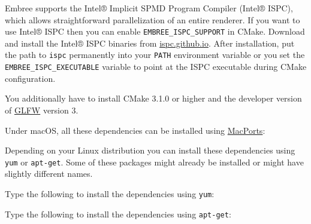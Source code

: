 Embree supports the Intel® Implicit SPMD Program Compiler (Intel® ISPC),
which allows straightforward parallelization of an entire renderer. If
you want to use Intel® ISPC then you can enable
\texttt{EMBREE\_ISPC\_SUPPORT} in CMake. Download and install the Intel®
ISPC binaries from
\href{https://ispc.github.io/downloads.html}{ispc.github.io}. After
installation, put the path to \texttt{ispc} permanently into your
\texttt{PATH} environment variable or you set the
\texttt{EMBREE\_ISPC\_EXECUTABLE} variable to point at the ISPC
executable during CMake configuration.

You additionally have to install CMake 3.1.0 or higher and the developer
version of \href{https://www.glfw.org/}{GLFW} version 3.

Under macOS, all these dependencies can be installed using
\href{http://www.macports.org/}{MacPorts}:

\begin{Shaded}
\begin{Highlighting}[]
\OperatorTok{{-}}\OperatorTok{{-}}
\end{Highlighting}
\end{Shaded}

Depending on your Linux distribution you can install these dependencies
using \texttt{yum} or \texttt{apt-get}. Some of these packages might
already be installed or might have slightly different names.

Type the following to install the dependencies using \texttt{yum}:

\begin{Shaded}
\begin{Highlighting}[]
\OperatorTok{{-}}
\OperatorTok{{-}}
\end{Highlighting}
\end{Shaded}

Type the following to install the dependencies using \texttt{apt-get}:

\begin{Shaded}
\begin{Highlighting}[]
\OperatorTok{{-}}\OperatorTok{{-}}\OperatorTok{{-}}
\OperatorTok{{-}}\OperatorTok{{-}}
\OperatorTok{{-}}\OperatorTok{{-}}
\end{Highlighting}
\end{Shaded}

